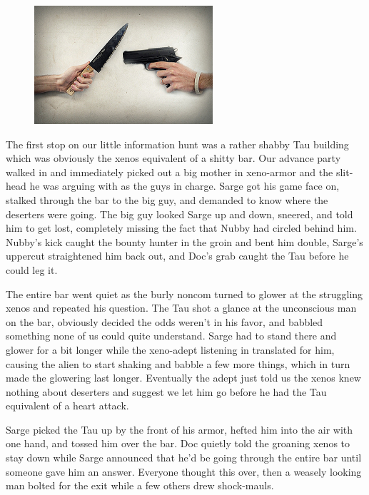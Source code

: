 \begin{figure}
	\begin{center}
		\includegraphics[width=\figwidth]{pics/10/22.png}
	\end{center}
\end{figure}
The first stop on our little information hunt was a rather shabby Tau building which was obviously the xenos equivalent of a shitty bar. 
Our advance party walked in and immediately picked out a big mother in xeno-armor and the slit-head he was arguing with as the guys in charge. 
Sarge got his game face on, stalked through the bar to the big guy, and demanded to know where the deserters were going. 
The big guy looked Sarge up and down, sneered, and told him to get lost, completely missing the fact that Nubby had circled behind him. 
Nubby's kick caught the bounty hunter in the groin and bent him double, Sarge's uppercut straightened him back out, and Doc's grab caught the Tau before he could leg it. 


The entire bar went quiet as the burly noncom turned to glower at the struggling xenos and repeated his question. 
The Tau shot a glance at the unconscious man on the bar, obviously decided the odds weren't in his favor, and babbled something none of us could quite understand. 
Sarge had to stand there and glower for a bit longer while the xeno-adept listening in translated for him, causing the alien to start shaking and babble a few more things, which in turn made the glowering last longer. 
Eventually the adept just told us the xenos knew nothing about deserters and suggest we let him go before he had the Tau equivalent of a heart attack.

Sarge picked the Tau up by the front of his armor, hefted him into the air with one hand, and tossed him over the bar. 
Doc quietly told the groaning xenos to stay down while Sarge announced that he'd be going through the entire bar until someone gave him an answer. 
Everyone thought this over, then a weasely looking man bolted for the exit while a few others drew shock-mauls. 


